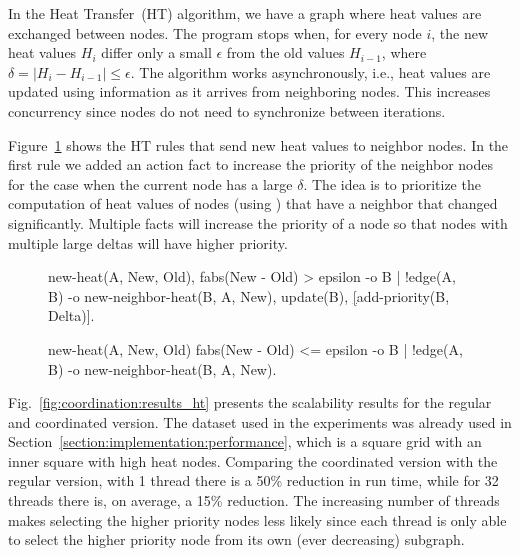 In the Heat Transfer~(HT) algorithm, we have a graph where heat values are
exchanged between nodes. The program stops when, for every node $i$, the new
heat values $H_i$ differ only a small $\epsilon$ from the old values $H_{i-1}$,
where $\delta = |H_i - H_{i-1}| \le \epsilon$. The algorithm works
asynchronously, i.e., heat values are updated using information as it arrives
from neighboring nodes. This increases concurrency since nodes do not need to
synchronize between iterations.

Figure~\ref{code:coord:ht} shows the HT rules that send new heat values to
neighbor nodes. In the first rule we added an  action fact to
increase the priority of the neighbor nodes for the case when the current node
has a large $\delta$. The idea is to prioritize the computation of heat values
of nodes (using ) that have a neighbor that changed significantly.
Multiple  facts will increase the priority of a node so that
nodes with multiple large deltas will have higher priority.

\begin{figure}[h!]
\begin{LineCode}[commandchars=\\\[\]]
new-heat(A, New, Old),
fabs(New - Old) > epsilon
   -o {B | !edge(A, B) -o
         new-neighbor-heat(B, A, New),
         update(B), \underline[add-priority(B, Delta)]}.

new-heat(A, New, Old)
fabs(New - Old) <= epsilon
   -o {B | !edge(A, B) -o
         new-neighbor-heat(B, A, New)}.
\end{LineCode}
  \label{code:coord:ht}
\end{figure}

Fig.~\ref{fig:coordination:results_ht} presents the scalability results for the
regular and coordinated version. The dataset used in the experiments was already
used in Section~\ref{section:implementation:performance}, which is a square grid
with an inner square with high heat nodes. Comparing the coordinated version
with the regular version, with 1 thread there is a 50\% reduction in run time,
while for 32 threads there is, on average, a 15\% reduction. The increasing
number of threads makes selecting the higher priority nodes less likely since
each thread is only able to select the higher priority node from its own (ever
decreasing) subgraph.

